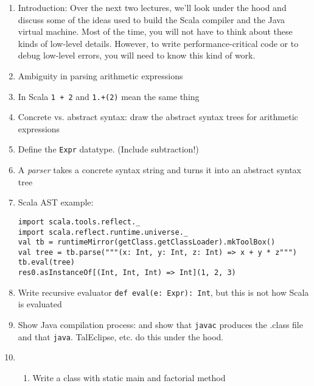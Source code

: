 \documentclass[9pt]{extbook}
\begin{document}
\begin{enumerate}

  \item Introduction: Over the next two lectures, we'll look under the
hood and discuss some of the ideas used to build the Scala compiler
and the Java virtual machine.  Most of the time, you will not have to
think about these kinds of low-level details.  However, to write
performance-critical code or to debug low-level errors, you will need
to know this kind of work.

  \item Ambiguity in parsing arithmetic expressions

  \item In Scala \lstinline|1 + 2| and \lstinline|1.+(2)| mean the same thing

  \item Concrete vs. abstract syntax: draw the abstract syntax trees for arithmetic expressions

  \item Define the \lstinline|Expr| datatype. (Include subtraction!)

  \item A \emph{parser} takes a concrete syntax string and turns it into an abstract syntax tree

  \item Scala AST example:

\begin{lstlisting}
import scala.tools.reflect._
import scala.reflect.runtime.universe._
val tb = runtimeMirror(getClass.getClassLoader).mkToolBox()
val tree = tb.parse("""(x: Int, y: Int, z: Int) => x + y * z""")
tb.eval(tree)
res0.asInstanceOf[(Int, Int, Int) => Int](1, 2, 3)
\end{lstlisting}

  \item Write recursive evaluator \lstinline|def eval(e: Expr): Int|, but this is not how Scala is evaluated

  \item Show Java compilation process:
    and show that \lstinline|javac| produces the .class file
  and that \lstinline|java|. TalEclipse, etc. do this under the hood.

  \item 

  \begin{enumerate}

    \item Write a class with static main  and factorial method


\end{enumerate}
\end{enumerate}
\end{document}

